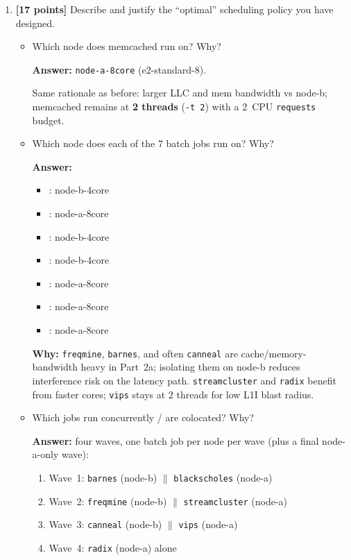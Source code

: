 \begin{enumerate}
\begin{enumerate}
    \item \textbf{[17 points]} Describe and justify the “optimal” scheduling policy you have designed. 
    
    \begin{itemize}
        \item Which node does memcached run on? Why?

        \textbf{Answer:} \texttt{node-a-8core} (e2-standard-8).

Same rationale as before: larger LLC and mem bandwidth vs node-b; memcached
remains at \textbf{2 threads} (\texttt{-t~2}) with a 2~CPU \texttt{requests}
budget.

        \item Which node does each of the 7 batch jobs run on? Why?

        \textbf{Answer:}
        \begin{itemize}
            \item {}: node-b-4core
            
            \item {}: node-a-8core
            
            \item {}: node-b-4core
            
            \item {}: node-b-4core
            
            \item {}: node-a-8core
            
            \item {}: node-a-8core
            
            \item {}: node-a-8core
        \end{itemize}

        \textbf{Why:} \texttt{freqmine}, \texttt{barnes}, and often \texttt{canneal} are cache/memory-bandwidth heavy in Part~2a; isolating them on node-b reduces interference risk on the latency path.  \texttt{streamcluster} and \texttt{radix} benefit from faster cores; \texttt{vips} stays at 2 threads for low L1I blast radius.

        \item Which jobs run concurrently / are colocated? Why?

        \textbf{Answer:} four waves, one batch job per node per wave (plus a final
node-a-only wave):
\begin{enumerate}
  \item Wave~1: \texttt{barnes} (node-b) $\|$ \texttt{blackscholes} (node-a)
  \item Wave~2: \texttt{freqmine} (node-b) $\|$ \texttt{streamcluster} (node-a)
  \item Wave~3: \texttt{canneal} (node-b) $\|$ \texttt{vips} (node-a)
  \item Wave~4: \texttt{radix} (node-a) alone
\end{enumerate}



\end{itemize}
\end{enumerate}
\end{enumerate}
